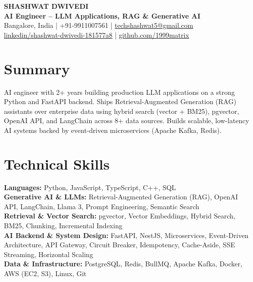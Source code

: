 \documentclass[10pt,letterpaper]{article}
\begin{document}
\begin{center}
    {\LARGE \textbf{SHASHWAT DWIVEDI}} \\[1pt]
    \textbf{AI Engineer -- LLM Applications, RAG \& Generative AI} \\[3pt]

    Bangalore, India
    \;|\;
    +91-9911007561
    \;|\;
    \href{mailto:techshashwat5@gmail.com}{techshashwat5@gmail.com} \\[1pt]
    \href{https://linkedin.com/in/shashwat-dwivedi-181577a8}{linkedin/shashwat-dwivedi-181577a8}
    \;|\;
    \href{https://github.com/1999matrix}{github.com/1999matrix}
\end{center}

\vspace{-5pt}

\section{Summary}
AI engineer with 2+ years building production LLM applications on a strong Python and FastAPI backend. Ships Retrieval-Augmented Generation (RAG) assistants over enterprise data using hybrid search (vector + BM25), pgvector, OpenAI API, and LangChain across 8+ data sources. Builds scalable, low-latency AI systems backed by event-driven microservices (Apache Kafka, Redis).

\section{Technical Skills}

\textbf{Languages:} Python, JavaScript, TypeScript, C++, SQL \\[1pt]
\textbf{Generative AI \& LLMs:} Retrieval-Augmented Generation (RAG), OpenAI API, LangChain, Llama 3, Prompt Engineering, Semantic Search \\[1pt]
\textbf{Retrieval \& Vector Search:} pgvector, Vector Embeddings, Hybrid Search, BM25, Chunking, Incremental Indexing \\[1pt]
\textbf{AI Backend \& System Design:} FastAPI, NestJS, Microservices, Event-Driven Architecture, API Gateway, Circuit Breaker, Idempotency, Cache-Aside, SSE Streaming, Horizontal Scaling \\[1pt]
\textbf{Data \& Infrastructure:} PostgreSQL, Redis, BullMQ, Apache Kafka, Docker, AWS (EC2, S3), Linux, Git

\end{document}
